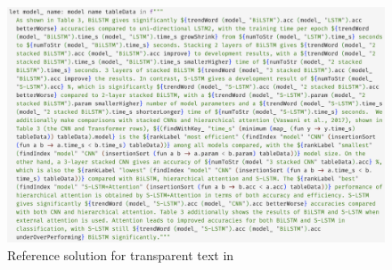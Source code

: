 \begin{figure}[h]
    \small
    \includegraphics[scale=0.169]{fig/scigen-1805.02474v1-10-src-screenshot.png}
    \caption{Reference solution for transparent text in }
    \label{fig:fluid-example-paragraph}
\end{figure}
